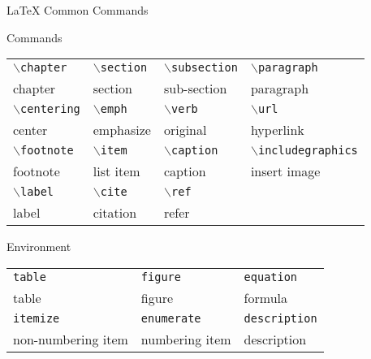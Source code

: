 \documentclass{beamer}
\def\cmd#1{\texttt{\color{red}\footnotesize $\backslash$#1}}
\def\env#1{\texttt{\color{blue}\footnotesize #1}}
\begin{document}
\begin{frame}[fragile]{\LaTeX{} Common Commands}
    \begin{exampleblock}{Commands}
        \centering
        \footnotesize
        \begin{tabular}{llll}
            \cmd{chapter} & \cmd{section} & \cmd{subsection} & \cmd{paragraph} \\
            chapter & section & sub-section & paragraph \\\hline
            \cmd{centering} & \cmd{emph} & \cmd{verb} & \cmd{url} \\
            center & emphasize & original & hyperlink \\\hline
            \cmd{footnote} & \cmd{item} & \cmd{caption} & \cmd{includegraphics} \\
            footnote & list item & caption & insert image \\\hline
            \cmd{label} & \cmd{cite} & \cmd{ref} \\
            label & citation & refer\\\hline
        \end{tabular}
    \end{exampleblock}
    \begin{exampleblock}{Environment}
        \centering
        \footnotesize
        \begin{tabular}{lll}
            \env{table} & \env{figure} & \env{equation}\\
            table & figure & formula \\\hline
            \env{itemize} & \env{enumerate} & \env{description}\\
            non-numbering item & numbering item & description \\\hline
        \end{tabular}
    \end{exampleblock}
\end{frame}
\end{document}
